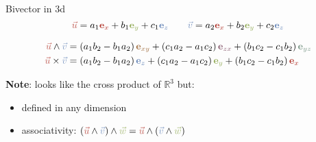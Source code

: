 \begin{frame}{Bivector in 3d}
    \Large
    \[
        \textcolor{u}{\vec{u}} = a_1 \textcolor{red}{\mathbf{e}_x} + b_1 \textcolor{green}{\mathbf{e}_y} + c_1 \textcolor{blue}{\mathbf{e}_z}
        \quad\quad
        \textcolor{v}{\vec{v}} = a_2 \textcolor{red}{\mathbf{e}_x} + b_2 \textcolor{green}{\mathbf{e}_y} + c_2 \textcolor{blue}{\mathbf{e}_z}
    \]

    \vspace{0.5em}

    \begin{align*}
        \textcolor{u}{\vec{u}} \wedge \textcolor{v}{\vec{v}} & =
        (a_1 b_2 - b_1 a_2)\, \textcolor{midredgreen}{\mathbf{e}_{xy}}
        + (c_1 a_2 - a_1 c_2)\, \textcolor{midredblue}{\mathbf{e}_{zx}}
        + (b_1 c_2 - c_1 b_2)\, \textcolor{midgreenblue}{\mathbf{e}_{yz}}
        \\
        \textcolor{u}{\vec{u}} \times \textcolor{v}{\vec{v}} & =
        (a_1 b_2 - b_1 a_2)\, \textcolor{blue}{\mathbf{e}_z}
        + (c_1 a_2 - a_1 c_2)\, \textcolor{green}{\mathbf{e}_y}
        + (b_1 c_2 - c_1 b_2)\, \textcolor{red}{\mathbf{e}_x}
    \end{align*}

    \vspace{0.5em}

    \textbf{Note}: looks like the cross product of \(\mathbb{R}^3\) but:
    \begin{itemize}
        \item defined in any dimension
        \item associativity: \((\textcolor{u}{\vec{u}} \wedge \textcolor{v}{\vec{v}}) \wedge \textcolor{w}{\vec{w}} = \textcolor{u}{\vec{u}} \wedge (\textcolor{v}{\vec{v}} \wedge \textcolor{w}{\vec{w}})\)
    \end{itemize}
\end{frame}

